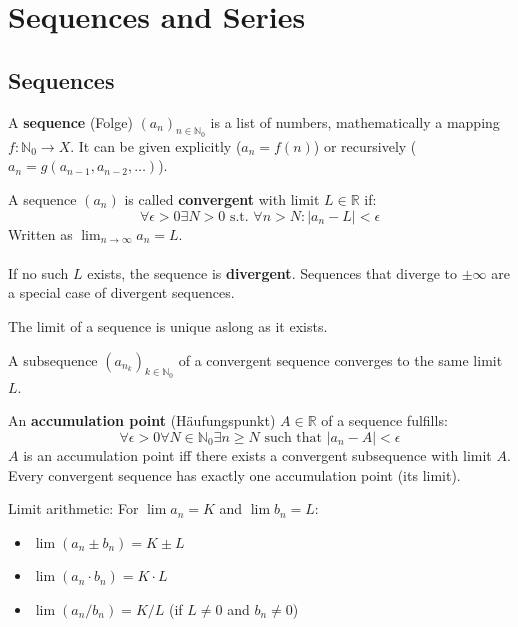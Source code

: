 \section{Sequences and Series}

\subsection{Sequences}

\begin{definition}
A \textbf{sequence} (Folge) $(a_n)_{n \in \mathbb{N}_0}$ is a list of numbers, mathematically a mapping $f: \mathbb{N}_0 \to X$. It can be given explicitly ($a_n = f(n)$) or recursively ($a_n = g(a_{n-1}, a_{n-2}, \dots)$).
\end{definition}

\begin{definition}
A sequence $(a_n)$ is called \textbf{convergent} with limit $L \in \mathbb{R}$ if:
$$\forall \epsilon \gt 0 \exists N \gt 0 \text{ s.t. } \forall n \gt N : |a_n - L| \lt \epsilon$$
Written as $\lim_{n \to \infty} a_n = L$.
\\ \\
If no such $L$ exists, the sequence is \textbf{divergent}. Sequences that diverge to $\pm \infty$ are a special case of divergent sequences.
\end{definition}

\begin{theorem}
The limit of a sequence is unique aslong as it exists.
\end{theorem}

\begin{theorem}
A subsequence $(a_{n_k})_{k \in \mathbb{N}_0}$ of a convergent sequence converges to the same limit $L$.
\end{theorem}

\begin{definition}
An \textbf{accumulation point} (Häufungspunkt) $A \in \mathbb{R}$ of a sequence fulfills:
$$\forall \epsilon \gt 0 \forall N \in \mathbb{N}_0 \exists n \ge N \text{ such that } |a_n - A| \lt \epsilon$$
$A$ is an accumulation point iff there exists a convergent subsequence with limit $A$. Every convergent sequence has exactly one accumulation point (its limit).
\end{definition}

\begin{theorem}
Limit arithmetic: For $\lim a_n = K$ and $\lim b_n = L$:
\begin{itemize}
    \item $\lim (a_n \pm b_n) = K \pm L$
    \item $\lim (a_n \cdot b_n) = K \cdot L$
    \item $\lim (a_n / b_n) = K / L$ (if $L \neq 0$ and $b_n \neq 0$)
\end{itemize}
\end{theorem}

